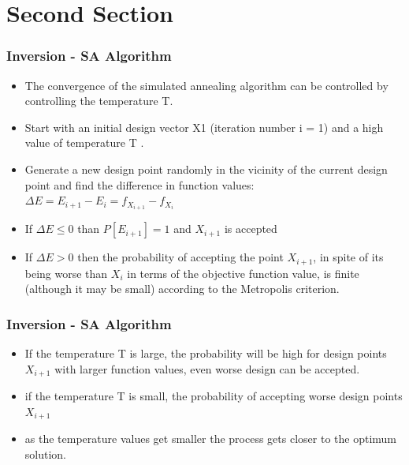 \documentclass{beamer}
\begin{document}
\section{Second Section}
\begin{frame}
\frametitle{Inversion - SA Algorithm}

\begin{itemize}
\item The convergence of the simulated annealing algorithm can be controlled by controlling the
temperature T.
\item Start with an initial design vector
X1 (iteration number i = 1) and a high value of temperature T . 
\item Generate a new design point randomly in the vicinity of the current design point and find the difference in
function values:  $\Delta{E}=E_{i+1} - E_{i} = f_{X_{i+1}}-f_{X_{i}}$
\item If $\Delta{E}\leq 0$ than $P[E_{i+1}]=1$ and ${X_{i+1}}$ is accepted
\item If $\Delta{E} > 0$ then the probability of accepting
the point $X_{i+1}$, in spite of its being worse than $X_i$ in terms of the objective function
value, is finite (although it may be small) according to the Metropolis criterion.
\end{itemize}
\end{frame}
\begin{frame}
\frametitle{Inversion - SA Algorithm}

\begin{itemize}
\begin{block}{Metropolis criterion}
According to Metropolis criterion, the probability of the next design point
(state) $X_{i+1}$ depends on the difference in the energy state or function values at the two
design points (states).  $P[E_{i+1}]=[exp(\frac{\Delta E} {T})]$
\end{block}
\item If the temperature T is large, the probability will be high
for design points $X_{i+1}$ with larger function values, even worse design can be accepted.
\item if the temperature T is small, the probability
of accepting worse design points $X_{i+1}$
\item as the temperature values get smaller the  process gets closer to the
optimum solution.
\end{itemize}
\end{frame}
\end{document}
